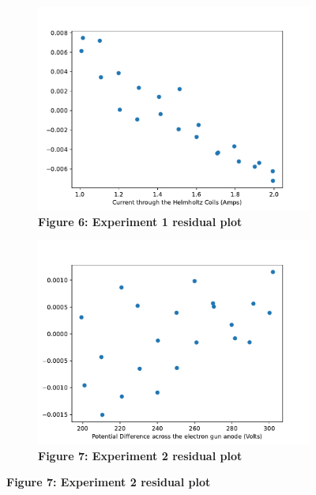 \documentclass[
	letterpaper, %
	10pt, %
]{CSUniSchoolLabReport}
\begin{document}
\begin{figure}[H]
\begin{subfigure}{0.45\textwidth}
	\end{subfigure}
	\begin{subfigure}{0.45\textwidth}
		\includegraphics[width=\textwidth]{../figures/variedCurrentResiduals.pdf}
		\caption{\textbf{Figure 6: Experiment 1 residual plot}}
	\end{subfigure}\qquad\quad
	\begin{subfigure}{0.45\textwidth}
		\includegraphics[width=\textwidth]{../figures/variedVoltageResiduals.pdf}
		\caption{\textbf{Figure 7: Experiment 2 residual plot}}
	\end{subfigure}
\end{figure}
\end{document}
